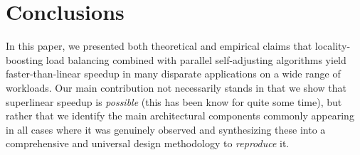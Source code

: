\section{Conclusions}\label{sec:conclusions}

In this paper, we presented both theoretical and empirical claims that locality-boosting load balancing combined with parallel self-adjusting algorithms yield faster-than-linear speedup in many disparate applications on a wide range of workloads. Our main contribution not necessarily stands in that we show that superlinear speedup is \emph{possible} (this has been know for quite some time), but rather that we identify the main architectural components commonly appearing in all cases where it was genuinely observed and synthesizing these into a comprehensive and universal design methodology to \emph{reproduce} it.



